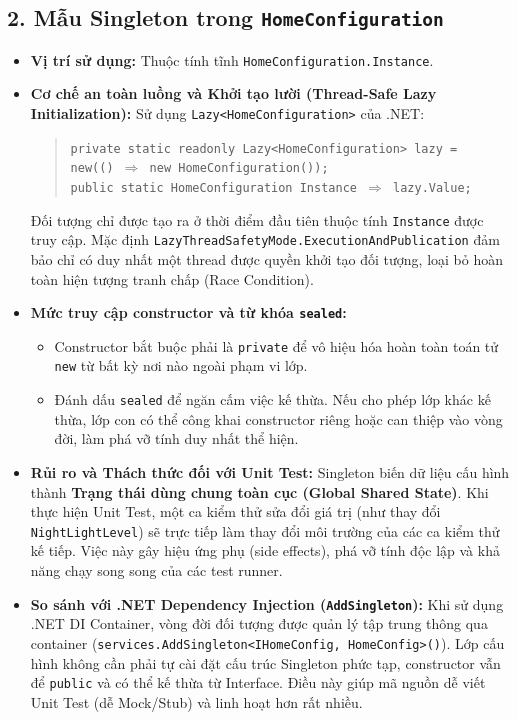 \documentclass[11pt,a4paper]{article}
\begin{document}
\subsection{2. Mẫu Singleton trong \texttt{HomeConfiguration}}
\begin{itemize}[itemsep=1.2pt]
    \item \textbf{Vị trí sử dụng:} Thuộc tính tĩnh \texttt{HomeConfiguration.Instance}.
    \item \textbf{Cơ chế an toàn luồng và Khởi tạo lười (Thread-Safe Lazy Initialization):}
    Sử dụng \texttt{Lazy\textless HomeConfiguration\textgreater} của .NET:
    \begin{quote}
    \texttt{private static readonly Lazy\textless HomeConfiguration\textgreater\ lazy =}\\
    \hspace*{0.5cm}\texttt{new(() $\Rightarrow$ new HomeConfiguration());}\\[2pt]
    \texttt{public static HomeConfiguration Instance $\Rightarrow$ lazy.Value;}
    \end{quote}
    Đối tượng chỉ được tạo ra ở thời điểm đầu tiên thuộc tính \texttt{Instance} được truy cập. Mặc định \texttt{LazyThreadSafetyMode.ExecutionAndPublication} đảm bảo chỉ có duy nhất một thread được quyền khởi tạo đối tượng, loại bỏ hoàn toàn hiện tượng tranh chấp (Race Condition).
    \item \textbf{Mức truy cập constructor và từ khóa \texttt{sealed}:}
    \begin{itemize}[itemsep=1.0pt]
        \item Constructor bắt buộc phải là \texttt{private} để vô hiệu hóa hoàn toàn toán tử \texttt{new} từ bất kỳ nơi nào ngoài phạm vi lớp.
        \item Đánh dấu \texttt{sealed} để ngăn cấm việc kế thừa. Nếu cho phép lớp khác kế thừa, lớp con có thể công khai constructor riêng hoặc can thiệp vào vòng đời, làm phá vỡ tính duy nhất thể hiện.
    \end{itemize}
    \item \textbf{Rủi ro và Thách thức đối với Unit Test:}
    Singleton biến dữ liệu cấu hình thành \textbf{Trạng thái dùng chung toàn cục (Global Shared State)}. Khi thực hiện Unit Test, một ca kiểm thử sửa đổi giá trị (như thay đổi \texttt{NightLightLevel}) sẽ trực tiếp làm thay đổi môi trường của các ca kiểm thử kế tiếp. Việc này gây hiệu ứng phụ (side effects), phá vỡ tính độc lập và khả năng chạy song song của các test runner.
    \item \textbf{So sánh với .NET Dependency Injection (\texttt{AddSingleton}):}
    Khi sử dụng .NET DI Container, vòng đời đối tượng được quản lý tập trung thông qua container (\texttt{services.AddSingleton\textless IHomeConfig, HomeConfig\textgreater()}). Lớp cấu hình không cần phải tự cài đặt cấu trúc Singleton phức tạp, constructor vẫn để \texttt{public} và có thể kế thừa từ Interface. Điều này giúp mã nguồn dễ viết Unit Test (dễ Mock/Stub) và linh hoạt hơn rất nhiều.
\end{itemize}
\end{document}
